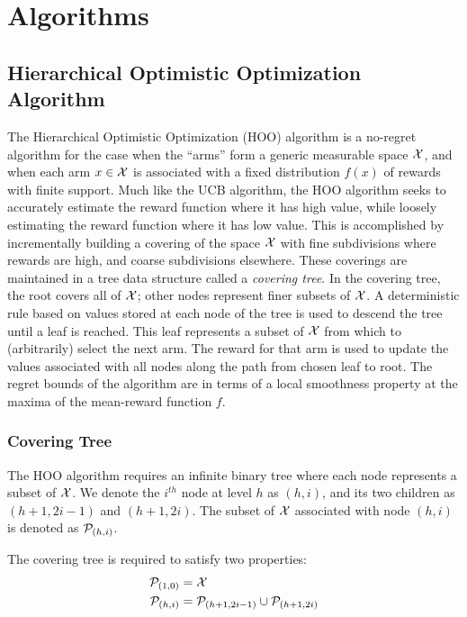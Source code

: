 \section{Algorithms}

\subsection{Hierarchical Optimistic Optimization Algorithm}

The Hierarchical Optimistic Optimization (HOO) algorithm is a
no-regret algorithm for the case when the ``arms'' form a generic
measurable space ${\mathcal{X}}$, and when each arm $x \in {\mathcal{X}}$ is associated
with a fixed distribution $f(x)$ of rewards with finite support. Much
like the UCB algorithm, the HOO algorithm seeks to accurately estimate
the reward function where it has high value, while loosely estimating
the reward function where it has low value. This is accomplished by
incrementally building a covering of the space ${\mathcal{X}}$ with fine
subdivisions where rewards are high, and coarse subdivisions
elsewhere. These coverings are maintained in a tree data structure
called a \emph{covering tree}. In the covering tree, the root covers
all of ${\mathcal{X}}$; other nodes represent finer subsets of ${\mathcal{X}}$. A
deterministic rule based on values stored at each node of the tree is
used to descend the tree until a leaf is reached. This leaf represents
a subset of ${\mathcal{X}}$ from which to (arbitrarily) select the next arm. The
reward for that arm is used to update the values associated with all
nodes along the path from chosen leaf to root. The regret bounds of
the algorithm are in terms of a local smoothness property at the
maxima of the mean-reward function $f$.

\subsubsection{Covering Tree}\label{sss:coverTree}
The HOO algorithm requires an infinite binary tree where each node
represents a subset of ${\mathcal{X}}$. We denote the $i^{th}$ node at level
$h$ as $(h,i)$, and its two children as $(h+1, 2i-1)$ and $(h+1,
2i)$. The subset of ${\mathcal{X}}$ associated with node $(h,i)$ is denoted
as ${\mathcal{P}}_{(h,i)}$.

The covering tree is required to satisfy two properties:
\begin{align*}
  {\mathcal{P}}_{(1,0)} &= {\mathcal{X}}\\
  {\mathcal{P}}_{(h,i)} &= {\mathcal{P}}_{(h+1,2i-1)} \cup {\mathcal{P}}_{(h+1,2i)}
\end{align*}

